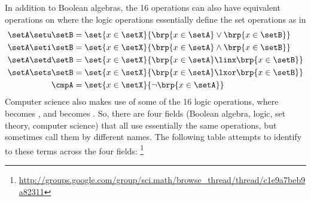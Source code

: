 In addition to Boolean algebras, the 16
operations can also have equivalent operations on  where the
logic operations essentially define the set operations as in
\begin{align*}
  \setA \setu \setB &= \set{x\in\setX}{\brp{x\in\setA} \lor \brp{x\in\setB}}  \\
  \setA \seti \setB &= \set{x\in\setX}{\brp{x\in\setA} \land \brp{x\in\setB}} \\
  \setA \setd \setB &= \set{x\in\setX}{\brp{x\in\setA} \linx \brp{x\in\setB}} \\
  \setA \sets \setB &= \set{x\in\setX}{\brp{x\in\setA} \lxor \brp{x\in\setB}} \\
  \cmpA             &= \set{x\in\setX}{\lnot\brp{x\in\setA}}
\end{align*}
Computer science also makes use of some of the 16 logic operations,
where  becomes , and  becomes .
So, there are four fields (Boolean algebra, logic, set theory,
computer science) that all use essentially the same operations, but
sometimes call them by different names.
The following table attempts to identify to these terms across the four fields:%
\footnote{\url{http://groups.google.com/group/sci.math/browse_thread/thread/c1e9a7beb9a82311}}
\\
